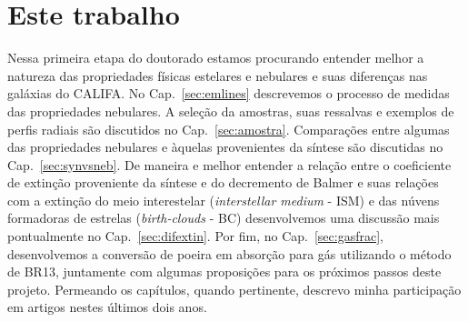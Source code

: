\section{Este trabalho}
\label{sec:intro:estetrabalho}

Nessa primeira etapa do doutorado estamos procurando entender melhor a natureza das propriedades
físicas estelares e nebulares e suas diferenças nas galáxias do CALIFA. No Cap.\ \ref{sec:emlines}
descrevemos o processo de medidas das propriedades nebulares. A seleção da amostras, suas ressalvas
e exemplos de perfis radiais são discutidos no Cap.\ \ref{sec:amostra}. Comparações entre algumas das
propriedades nebulares e àquelas provenientes da síntese são discutidas no Cap.\ \ref{sec:synvsneb}.
De maneira e melhor entender a relação entre o coeficiente de extinção proveniente da síntese e do
decremento de Balmer e suas relações com a extinção do meio interestelar ({\em interstellar medium}
- ISM) e das núvens formadoras de estrelas ({\em birth-clouds} - BC) desenvolvemos uma discussão
mais pontualmente no Cap.\ \ref{sec:difextin}. Por fim, no Cap.\ \ref{sec:gasfrac}, desenvolvemos a
conversão de poeira em absorção para gás utilizando o método de BR13, juntamente com algumas
proposições para os próximos passos deste projeto. Permeando os capítulos, quando pertinente,
descrevo minha participação em artigos nestes últimos dois anos.

